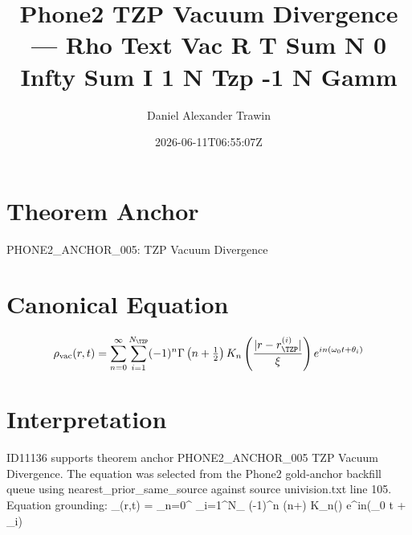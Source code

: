\documentclass[11pt]{article}
\title{Phone2 TZP Vacuum Divergence — Rho Text Vac R T Sum N 0 Infty Sum I 1 N Tzp -1 N Gamm}
\author{Daniel Alexander Trawin}
\date{2026-06-11T06:55:07Z}
\begin{document}
\maketitle
\section*{Theorem Anchor}
PHONE2_ANCHOR_005: TZP Vacuum Divergence
\section*{Canonical Equation}
\[
\rho_{\text{vac}}(r,t) = \sum_{n=0}^{\infty} \sum_{i=1}^{N_{\TZP}} (-1)^n \Gamma\left(n+\tfrac{1}{2}\right) K_n\left(\frac{|r-r_{\TZP}^{(i)}|}{\xi}\right) e^{in(\omega_0 t + \theta_i)}
\]
\section*{Interpretation}
ID11136 supports theorem anchor PHONE2_ANCHOR_005 TZP Vacuum Divergence. The equation was selected from the Phone2 gold-anchor backfill queue using nearest_prior_same_source against source univision.txt line 105. Equation grounding: \rho_{}(r,t) = \sum_{n=0}^{\infty} \sum_{i=1}^{N_{\TZP}} (-1)^n \Gamma\left(n+\right) K_n\left(\right) e^{in(\omega_0 t + \theta_i)}
\end{document}
